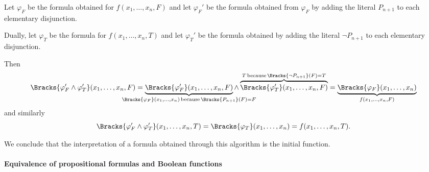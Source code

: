 \begin{defproof}
\begin{itemize}
    Let \( \varphi_F \) be the formula obtained for \( f(x_1, \ldots, x_n, F) \) and let \( \varphi_F' \) be the formula obtained from \( \varphi_F \) by adding the literal \( P_{n+1} \) to each elementary disjunction.

    Dually, let \( \varphi_T \) be the formula for \( f(x_1, \ldots, x_n, T) \) and let \( \varphi_T' \) be the formula obtained by adding the literal \( \neg P_{n+1} \) to each elementary disjunction.

    Then
    \begin{equation*}
      \Bracks{\varphi_F' \wedge \varphi_T'}(x_1, \ldots, x_n, F)
      =
      \underbrace{\Bracks{\varphi_F'}(x_1, \ldots, x_n, F)}_{\mathclap{\Bracks{\varphi_F}(x_1, \ldots, x_n) \T*{because} \Bracks{P_{n+1}}(F) = F}} \wedge \overbrace{\Bracks{\varphi_T'}(x_1, \ldots, x_n, F)}^{T \T*{because} \Bracks{\neg P_{n+1}}(F) = T}
      =
      \underbrace{\Bracks{\varphi_F}(x_1, \ldots, x_n)}_{f(x_1, \ldots, x_n, F)}
    \end{equation*}
    and similarly
    \begin{equation*}
      \Bracks{\varphi_F' \wedge \varphi_T'}(x_1, \ldots, x_n, T)
      =
      \Bracks{\varphi_T}(x_1, \ldots, x_n)
      =
      f(x_1, \ldots, x_n, T).
    \end{equation*}
  \end{itemize}

  We conclude that the interpretation of a formula obtained through this algorithm is the initial function.
\end{defproof}

\paragraph{Equivalence of propositional formulas and Boolean functions}

